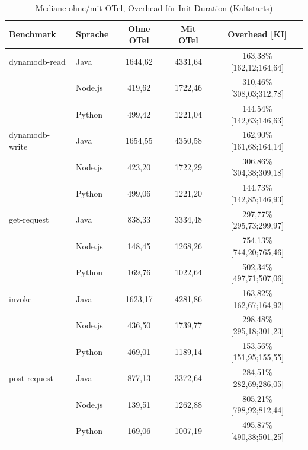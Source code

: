 \begin{table}[H]
\centering
\footnotesize
\caption{Mediane ohne/mit OTel, Overhead  für Init Duration (Kaltstarts)}
\label{app:boot-abs-init-cold}
\begin{tabular}{|l|l|c|c|c|}
\hline
\textbf{Benchmark} & \textbf{Sprache} & \textbf{Ohne OTel} & \textbf{Mit OTel} & \textbf{Overhead [KI]} \\
\hline
dynamodb-read   & Java    & 1644,62 & 4331,64 & 163,38\% [162,12;164,64] \\
                & Node.js &  419,62 & 1722,46 & 310,46\% [308,03;312,78] \\
                & Python  &  499,42 & 1221,04 & 144,54\% [142,63;146,63] \\
\hline
dynamodb-write  & Java    & 1654,55 & 4350,58 & 162,90\% [161,68;164,14] \\
                & Node.js &  423,20 & 1722,29 & 306,86\% [304,38;309,18] \\
                & Python  &  499,06 & 1221,20 & 144,73\% [142,85;146,93] \\
\hline
get-request     & Java    &  838,33 & 3334,48 & 297,77\% [295,73;299,97] \\
                & Node.js &  148,45 & 1268,26 & 754,13\% [744,20;765,46] \\
                & Python  &  169,76 & 1022,64 & 502,34\% [497,71;507,06] \\
\hline
invoke          & Java    & 1623,17 & 4281,86 & 163,82\% [162,67;164,92] \\
                & Node.js &  436,50 & 1739,77 & 298,48\% [295,18;301,23] \\
                & Python  &  469,01 & 1189,14 & 153,56\% [151,95;155,55] \\
\hline
post-request    & Java    &  877,13 & 3372,64 & 284,51\% [282,69;286,05] \\
                & Node.js &  139,51 & 1262,88 & 805,21\% [798,92;812,44] \\
                & Python  &  169,06 & 1007,19 & 495,87\% [490,38;501,25] \\
\hline
\end{tabular}
\end{table}

